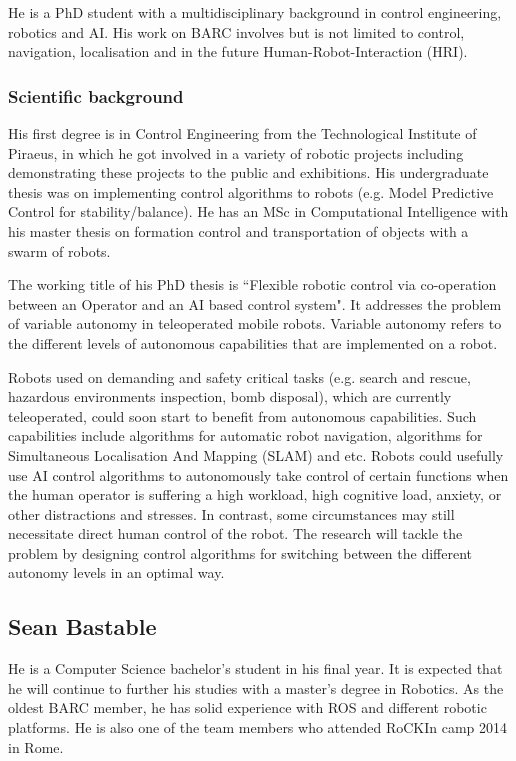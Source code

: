 He is a PhD student with a multidisciplinary background in control engineering, robotics and AI. His work on BARC involves but is not limited to control, navigation, localisation and in the future Human-Robot-Interaction (HRI).

\subsubsection*{Scientific background}

His first degree is in Control Engineering from the Technological Institute of Piraeus, in which he got involved in a variety of robotic projects including demonstrating these projects to the public and exhibitions. His undergraduate thesis was on implementing control algorithms to robots (e.g. Model Predictive Control for stability/balance). He has an MSc in Computational Intelligence with his master thesis on formation control and transportation of objects with a swarm of robots.  

The working title of his PhD thesis is ``Flexible robotic control via co-operation between an Operator and an AI based control system". It addresses the problem of variable autonomy in teleoperated mobile robots. Variable autonomy refers to the different levels of autonomous capabilities that are implemented on a robot.

Robots used on demanding and safety critical tasks (e.g. search and rescue, hazardous environments inspection, bomb disposal), which are currently teleoperated, could soon start to benefit from autonomous capabilities. Such capabilities include algorithms for automatic robot navigation, algorithms for Simultaneous Localisation And Mapping (SLAM) and etc. Robots could usefully use AI control algorithms to autonomously take control of certain functions when the human operator is suffering a high workload, high cognitive load, anxiety, or other distractions and stresses. In contrast, some circumstances may still necessitate direct human control of the robot. The research will tackle the problem by designing control algorithms for switching between the different autonomy levels in an optimal way. 


\subsection{Sean Bastable}

He is a Computer Science bachelor's student in his final year. It is expected that he will continue to further his studies with a master's degree in Robotics. As the oldest BARC member, he has solid experience with ROS and different robotic platforms. He is also one of the team members who attended RoCKIn camp 2014 in Rome.

